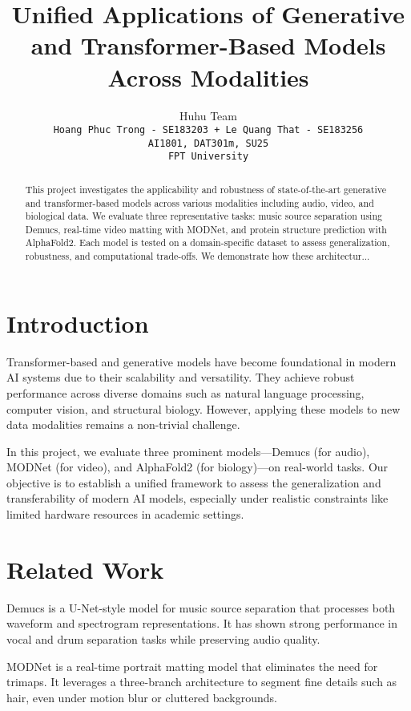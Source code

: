 \documentclass{article}
\title{Unified Applications of Generative and Transformer-Based Models Across Modalities}
\author{%
  Huhu Team \\ 
  \texttt{Hoang Phuc Trong - SE183203 + Le Quang That - SE183256} \\ 
  \texttt{AI1801, DAT301m, SU25} \\ 
  \texttt{FPT University} \\
}
\begin{document}
\maketitle

\begin{abstract}
This project investigates the applicability and robustness of state-of-the-art generative and transformer-based models across various modalities including audio, video, and biological data. We evaluate three representative tasks: music source separation using Demucs, real-time video matting with MODNet, and protein structure prediction with AlphaFold2. Each model is tested on a domain-specific dataset to assess generalization, robustness, and computational trade-offs. We demonstrate how these architectur...
\end{abstract}

\section{Introduction}

Transformer-based and generative models have become foundational in modern AI systems due to their scalability and versatility. They achieve robust performance across diverse domains such as natural language processing, computer vision, and structural biology. However, applying these models to new data modalities remains a non-trivial challenge.

In this project, we evaluate three prominent models—Demucs (for audio), MODNet (for video), and AlphaFold2 (for biology)—on real-world tasks. Our objective is to establish a unified framework to assess the generalization and transferability of modern AI models, especially under realistic constraints like limited hardware resources in academic settings.

\section{Related Work}

Demucs is a U-Net-style model for music source separation that processes both waveform and spectrogram representations. It has shown strong performance in vocal and drum separation tasks while preserving audio quality.

MODNet is a real-time portrait matting model that eliminates the need for trimaps. It leverages a three-branch architecture to segment fine details such as hair, even under motion blur or cluttered backgrounds.
\end{document}

